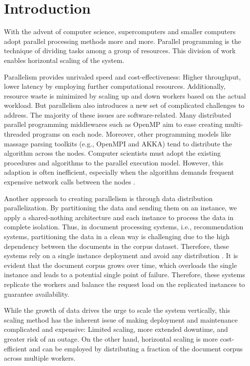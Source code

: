 \chapter{Introduction}

With the advent of computer science, supercomputers and smaller computers adopt parallel processing methods more and more. Parallel programming is the technique of dividing tasks among a group of resources. This division of work enables horizontal scaling of the system.


Parallelism provides unrivaled speed and cost-effectiveness: Higher throughput, lower latency by employing further computational resources. Additionally, resource waste is minimized by scaling up and down workers based on the actual workload. But parallelism also introduces a new set of complicated challenges to address. The majority of these issues are software-related. Many distributed parallel programming middlewares such as OpenMP aim to ease creating multi-threaded programs on each node. Moreover, other programming models like massage parsing toolkits (e.g., OpenMPI and AKKA) tend to distribute the algorithm across the nodes. Computer scientists must adopt the existing procedures and algorithms to the parallel execution model. However, this adaption is often inefficient, especially when the algorithm demands frequent expensive network calls between the nodes \cite{sharmaGraphJetRealtimeContent2016, eksombatchaiPixieSystemRecommending2018}.


Another approach to creating parallelism is through data distribution parallelization. By partitioning the data and sending them on an instance, we apply a shared-nothing architecture and each instance to process the data in complete isolation. Thus, in document processing systems, i.e., recommendation systems, partitioning the data in a clean way is challenging due to the high dependency between the documents in the corpus dataset. Therefore, these systems rely on a single instance deployment and avoid any distribution \cite{guptaWTFWhoFollow2013,sharmaGraphJetRealtimeContent2016, eksombatchaiPixieSystemRecommending2018}. It is evident that the document corpus grows over time, which overloads the single instance and leads to a potential single point of failure. Therefore, these systems replicate the workers and balance the request load on the replicated instances to guarantee availability.


While the growth of data drives the urge to scale the system vertically, this scaling method has the inherent issue of making deployment and maintenance complicated and expensive: Limited scaling, more extended downtime, and greater risk of an outage. On the other hand, horizontal scaling is more cost-efficient and can be employed by distributing a fraction of the document corpus across multiple workers.


